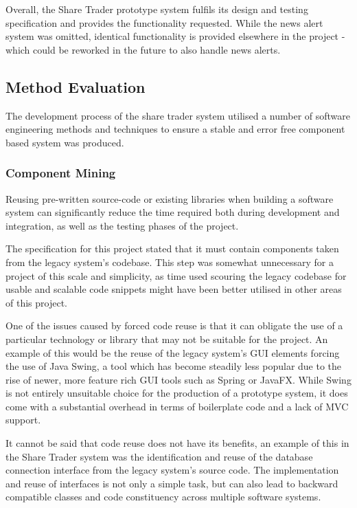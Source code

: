 \documentclass[12pt, a4paper,titlepage]{article}
\begin{document}
Overall, the Share Trader prototype system fulfils its design and testing
specification and provides the functionality requested. 
While the news alert system was omitted, identical functionality is provided
elsewhere in the project - which could be reworked in the future to also
handle news alerts.

\subsection{Method Evaluation}
The development process of the share trader system utilised a number of
software engineering methods and techniques to ensure a stable and error free
component  based system was produced.  

\subsubsection{Component Mining}
Reusing pre-written source-code or existing libraries when building a software
system can significantly reduce the time required both during development
and integration, as well as the testing phases of the project.

The specification for this project stated that it must contain components
taken from the legacy system’s codebase. 
This step was somewhat unnecessary for a project of this scale and simplicity,
as time used scouring the legacy codebase for usable and scalable code
snippets might have been better utilised in other areas of this project.

One of the issues caused by forced code reuse is that it can obligate the use
of a particular technology or library that may not be suitable for the
project. 
An example of this would be the reuse of the legacy system’s GUI elements
forcing the use of Java Swing, a tool which has become steadily less popular
due to the rise of newer, more feature rich GUI tools such as Spring or
JavaFX. 
While Swing is not entirely unsuitable choice for the production of a
prototype system, it does come with a substantial overhead in terms of
boilerplate code and a lack of MVC support.

It cannot be said that code reuse does not have its benefits, an example of
this in the Share Trader system was the identification and reuse of the
database connection interface from the legacy system’s source code. 
The implementation and reuse of interfaces is not only a simple task, but can
also lead to backward compatible classes and code constituency across multiple
software systems.
\end{document}

